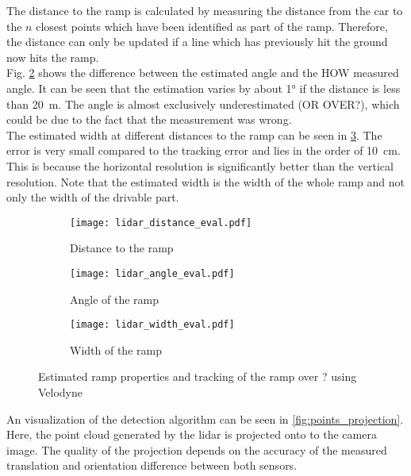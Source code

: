 The distance to the ramp is calculated by measuring the distance from the car to the $n$ closest points which have been identified as part of the ramp.
Therefore, the distance can only be updated if a line which has previously hit the ground now hits the ramp.\\
Fig. \ref{fig:lidar_angle_eval} shows the difference between the estimated angle and the HOW measured angle.
It can be seen that the estimation varies by about \ang{1} if the distance is less than \SI{20}{\metre}.
The angle is almost exclusively underestimated (OR OVER?), which could be due to the fact that the measurement was wrong.\\
The estimated width at different distances to the ramp can be seen in \ref{fig:lidar_width_eval}.
The error is very small compared to the tracking error and lies in the order of \SI{10}{\cm}.
This is because the horizontal resolution is significantly better than the vertical resolution.
Note that the estimated width is the width of the whole ramp and not only the width of the drivable part.\\
\begin{figure}[htbp]
    \centering
    \begin{subfigure}{1\textwidth}
        \centering
        \texttt{[image: lidar\_distance\_eval.pdf]}
        \caption{Distance to the ramp}
        \label{fig:lidar_distance_eval}
    \end{subfigure}
    
    \begin{subfigure}{1\textwidth}
        \centering
        \texttt{[image: lidar\_angle\_eval.pdf]}
        \caption{Angle of the ramp}
        \label{fig:lidar_angle_eval}
    \end{subfigure}
    
    \begin{subfigure}{1\textwidth}
        \centering
        \texttt{[image: lidar\_width\_eval.pdf]}
        \caption{Width of the ramp}
        \label{fig:lidar_width_eval}
    \end{subfigure}
    \caption{Estimated ramp properties and tracking of the ramp over ? using Velodyne}
    \label{fig:lidar_eval}
\end{figure}
An visualization of the detection algorithm can be seen in \cref{fig:points_projection}.
Here, the point cloud generated by the \gls{lidar} is projected onto to the camera image.
The quality of the projection depends on the accuracy of the measured translation and orientation difference between both sensors.

